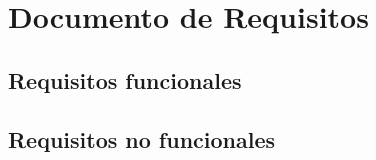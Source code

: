 \documentclass[12pt, a4paper]{exam}
\begin{document}
\rfoot{\thepage}

\section{Documento de Requisitos}
\blindtext

\subsection{Requisitos funcionales}
\blindtext

\subsection{Requisitos no funcionales}



% 

% 

% 







\end{document}
